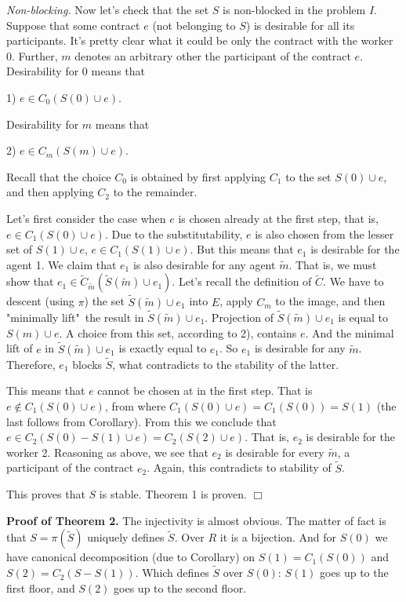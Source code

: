 \documentclass[12pt,a4paper]{article}
\begin{document}
\emph{Non-blocking.} Now let's check that the set $S$ is non-blocked in the problem $I$. Suppose that some contract $e$ (not belonging to $S$) is desirable for all its participants. It's pretty clear what it could be only the contract with the worker 0. Further, $m$ denotes an arbitrary other       the participant of the contract $e$. Desirability for 0 means that

      1) $e\in C_0(S(0)\cup e)$.

Desirability for $m$ means that

      2) $e\in C_m(S(m)\cup e)$.

Recall that the choice $C_0$ is obtained by first applying $C_1$ to the set      $S(0)\cup e$, and then applying $C_2$ to the remainder.

Let's first consider the case when $e$ is chosen already at the first step,      that is, $e\in C_1(S(0)\cup e)$. Due to the substitutability, $e$ is also chosen from the lesser set of $S(1)\cup e$, $e\in C_1(S(1)\cup e)$. But this means that $e_1$ is desirable for the agent 1. We claim that $e_1$ is also desirable for any agent $\widetilde m$. That is, we must show that $e_1\in \widetilde C_{\widetilde m}(\widetilde S(\widetilde m)\cup e_1)$. Let's recall the definition of $\widetilde C$. We have to descent (using $\pi$) the set $\widetilde S(\widetilde m)\cup e_1$ into $E$, apply $C_m$ to the image, and then "minimally lift"\ the result in $\widetilde S(\widetilde m)\cup e_1$. Projection of $\widetilde S(\widetilde m)\cup e_1$ is equal to $S(m)\cup e$. A choice from this set, according to 2), contains $e$. And the minimal lift of $e$ in $\widetilde S(\widetilde m)\cup e_1$ is exactly equal to $e_1$. So $e_1$ is desirable for any $\widetilde m$. Therefore, $e_1$ blocks $\widetilde S$, what contradicts to the stability of the latter.

This means that $e$ cannot be chosen at in the first step. That is $e\notin C_1(S(0)\cup e)$, from where $C_1(S(0)\cup e)=C_1(S(0))=S(1)$ (the last follows from Corollary). From this we conclude that $e\in C_2(S(0)-S(1)\cup e)=C_2(S(2)\cup e)$. That is, $e_2$ is desirable for the worker 2. Reasoning as above, we see that $e_2$ is desirable for every $\widetilde m$, a participant of the contract $e_2$. Again, this contradicts to stability of $\widetilde S$.

This proves that $S$ is stable. Theorem 1 is proven.  $\Box$\medskip

\textbf{Proof of Theorem 2.} The injectivity is almost obvious. The matter of fact is that $S=\pi (\widetilde S)$ uniquely defines $\widetilde S$. Over $R$ it is a bijection. And for $S(0)$ we have canonical decomposition (due to Corollary) on  $S(1)=C_1(S(0))$ and $S(2)=C_2(S-S(1))$. Which defines $\widetilde S$ over $S(0)$: $S(1)$ goes up to the first floor, and $S(2)$ goes up to the second floor.
\end{document}
